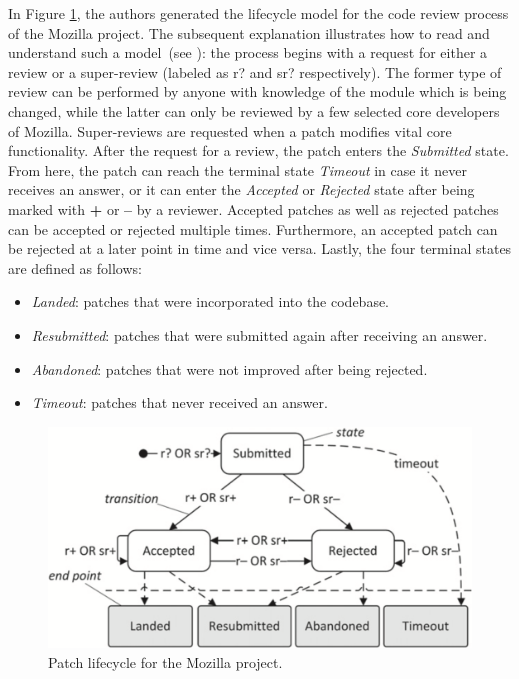 \documentclass[conference]{IEEEtran}
\begin{document}
In Figure \ref{fig:example_model}, the authors generated the lifecycle model for the code review process of the Mozilla project. The subsequent explanation illustrates how to read and understand such a model~(see \cite{baysal2015synthesizing}): the process begins with a request for either a review or a super-review (labeled as r? and sr? respectively). The former type of review can be performed by anyone with knowledge of the module which is being changed, while the latter can only be reviewed by a few selected core developers of Mozilla. Super-reviews are requested when a patch modifies vital core functionality. After the request for a review, the patch enters the \textit{Submitted} state. From here, the patch can reach the terminal state \textit{Timeout} in case it never receives an answer, or it can enter the \textit{Accepted} or \textit{Rejected} state after being marked with \textbf{+} or \textbf{--} by a reviewer. Accepted patches as well as rejected patches can be accepted or rejected multiple times. Furthermore, an accepted patch can be rejected at a later point in time and vice versa. Lastly, the four terminal states are defined as follows:

\begin{itemize}
    \item \textit{Landed}: patches that were incorporated into the codebase.
    \item \textit{Resubmitted}: patches that were submitted again after receiving an answer.
    \item \textit{Abandoned}: patches that were not improved after being rejected.
    \item \textit{Timeout}: patches that never received an answer.
\end{itemize}

\begin{figure}
    \centering
    \includegraphics[scale=0.15]{img/example_lifecycle_model.png}
    \caption{Patch lifecycle for the Mozilla project\cite{baysal2015synthesizing}.}
    \label{fig:example_model}
\end{figure}
\end{document}
